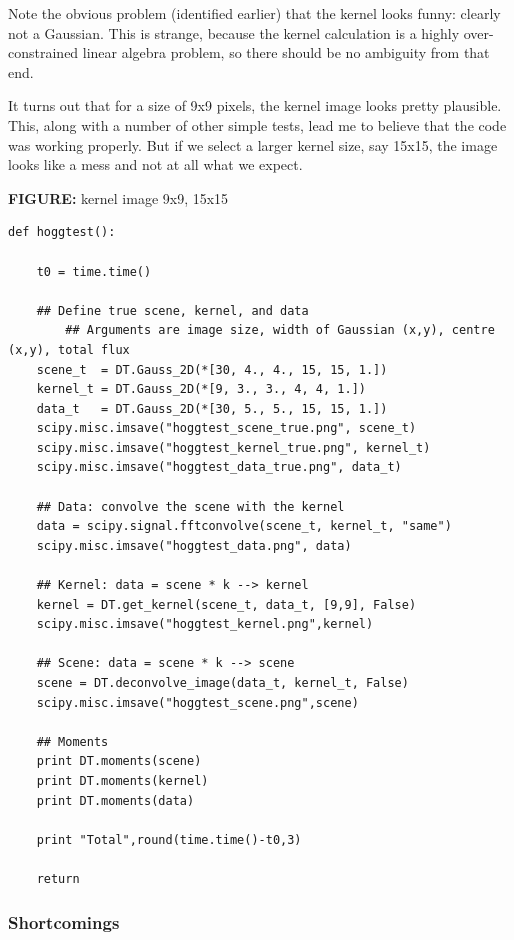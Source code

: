\documentclass[letterpaper, 11pt]{article}
\def\FIG#1{{\bf FIGURE: }{#1}}
\begin{document}
Note the obvious problem (identified earlier) that the kernel looks funny: clearly not a Gaussian. This is strange, because the kernel calculation is a highly over-constrained linear algebra problem, so there should be no ambiguity from that end.

It turns out that for a size of 9x9 pixels, the kernel image looks pretty plausible. This, along with a number of other simple tests, lead me to believe that the code was working properly. But if we select a larger kernel size, say 15x15, the image looks like a mess and not at all what we expect.

\FIG{kernel image 9x9, 15x15}


\label{cde:hoggtest}\begin{verbatim}
def hoggtest():
		
	t0 = time.time()
	
	## Define true scene, kernel, and data
		## Arguments are image size, width of Gaussian (x,y), centre (x,y), total flux
	scene_t  = DT.Gauss_2D(*[30, 4., 4., 15, 15, 1.])
	kernel_t = DT.Gauss_2D(*[9, 3., 3., 4, 4, 1.])
	data_t   = DT.Gauss_2D(*[30, 5., 5., 15, 15, 1.])
	scipy.misc.imsave("hoggtest_scene_true.png", scene_t)
	scipy.misc.imsave("hoggtest_kernel_true.png", kernel_t)
	scipy.misc.imsave("hoggtest_data_true.png", data_t)
	
	## Data: convolve the scene with the kernel
	data = scipy.signal.fftconvolve(scene_t, kernel_t, "same")
	scipy.misc.imsave("hoggtest_data.png", data)
	
	## Kernel: data = scene * k --> kernel
	kernel = DT.get_kernel(scene_t, data_t, [9,9], False)
	scipy.misc.imsave("hoggtest_kernel.png",kernel)
	
	## Scene: data = scene * k --> scene
	scene = DT.deconvolve_image(data_t, kernel_t, False)
	scipy.misc.imsave("hoggtest_scene.png",scene)
	
	## Moments
	print DT.moments(scene)
	print DT.moments(kernel)
	print DT.moments(data)
	
	print "Total",round(time.time()-t0,3)
	
	return
\end{verbatim}



\subsubsection{Shortcomings}
\end{document}
